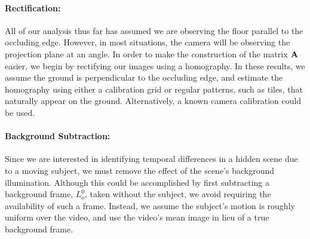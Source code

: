 \paragraph{Rectification:} All of our analysis thus far has assumed we are observing the floor
parallel to the occluding edge. %
However, in most situations, the camera will be observing the projection plane at an angle. In order to make the construction of the matrix $\mathbf{A}$ easier, we begin by rectifying our images using a homography. 
In these results, we assume the ground is perpendicular to the occluding edge, and estimate the homography using either a calibration grid or regular patterns, such as tiles, that naturally appear on the ground. Alternatively, a known camera calibration could be used. 



\vspace{-.1in}
\paragraph{Background Subtraction: }

Since we are interested in identifying temporal differences in a hidden scene due to a moving subject, we must
remove the effect of the scene's background illumination.  Although this could be accomplished by first subtracting a background frame, $L_o^0$, taken without the subject, we avoid requiring the availability of such a frame. Instead,  we assume the subject's motion is roughly uniform over the video, and use the video's mean image in lieu of a true background frame. 

